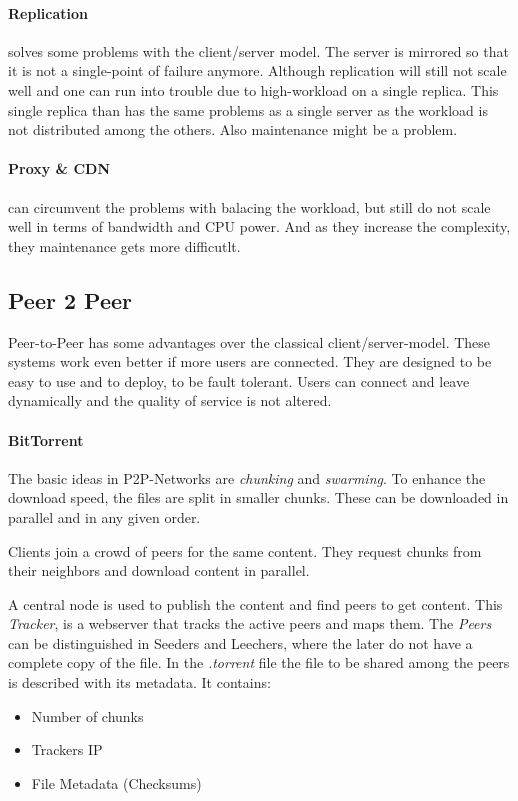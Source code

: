 \paragraph{Replication} %
\label{par:replication}
solves some problems with the client/server model.
The server is mirrored so that it is not a single-point of failure anymore.
Although replication will still not scale well
and one can run into trouble due to high-workload on a single replica.
This single replica than has the same problems as a single server
as the workload is not distributed among the others.
Also maintenance might be a problem.

\paragraph{Proxy \& CDN} %
\label{par:proxy_&_cdn}
can circumvent the problems with balacing the workload,
but still do not scale well in terms of bandwidth and CPU power.
And as they increase the complexity,
they maintenance gets more difficutlt.

\subsection{Peer 2 Peer} %
\label{sub:peer_2_peer}
Peer-to-Peer has some advantages over the classical client/server-model.
These systems work even better if more users are connected.
They are designed to be easy to use and to deploy,
to be fault tolerant.
Users can connect and leave dynamically and the quality of service is not altered.

\paragraph{BitTorrent} %
\label{par:bittorrent}
The basic ideas in P2P-Networks are \emph{chunking} and \emph{swarming}.
To enhance the download speed,
the files are split in smaller chunks.
These can be downloaded in parallel
and in any given order.

Clients join a crowd of peers for the same content.
They request chunks from their neighbors
and download content in parallel.

A central node is used to publish the content
and find peers to get content.
This \emph{Tracker}, is a webserver that tracks the active peers
and maps them.
The \emph{Peers} can be distinguished in Seeders and Leechers,
where the later do not have a complete copy of the file.
In the \emph{.torrent} file the file to be shared among the peers is described with its metadata.
It contains:\\
\begin{itemize}
	\item Number of chunks
	\item Trackers IP
	\item File Metadata (Checksums)
\end{itemize}




